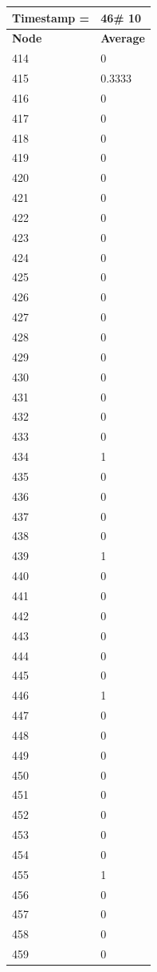 \begin{tabular}{|l||l|}
\hline
\textbf{Timestamp =} & \textbf{46}\# 10\\\hline
	\textbf{Node} & \textbf{Average} \\ \hline
\hline
	414 & 0 \\ \hline
	415 & 0.3333 \\ \hline
	416 & 0 \\ \hline
	417 & 0 \\ \hline
	418 & 0 \\ \hline
	419 & 0 \\ \hline
	420 & 0 \\ \hline
	421 & 0 \\ \hline
	422 & 0 \\ \hline
	423 & 0 \\ \hline
	424 & 0 \\ \hline
	425 & 0 \\ \hline
	426 & 0 \\ \hline
	427 & 0 \\ \hline
	428 & 0 \\ \hline
	429 & 0 \\ \hline
	430 & 0 \\ \hline
	431 & 0 \\ \hline
	432 & 0 \\ \hline
	433 & 0 \\ \hline
	434 & 1 \\ \hline
	435 & 0 \\ \hline
	436 & 0 \\ \hline
	437 & 0 \\ \hline
	438 & 0 \\ \hline
	439 & 1 \\ \hline
	440 & 0 \\ \hline
	441 & 0 \\ \hline
	442 & 0 \\ \hline
	443 & 0 \\ \hline
	444 & 0 \\ \hline
	445 & 0 \\ \hline
	446 & 1 \\ \hline
	447 & 0 \\ \hline
	448 & 0 \\ \hline
	449 & 0 \\ \hline
	450 & 0 \\ \hline
	451 & 0 \\ \hline
	452 & 0 \\ \hline
	453 & 0 \\ \hline
	454 & 0 \\ \hline
	455 & 1 \\ \hline
	456 & 0 \\ \hline
	457 & 0 \\ \hline
	458 & 0 \\ \hline
	459 & 0 \\ \hline
\end{tabular}
